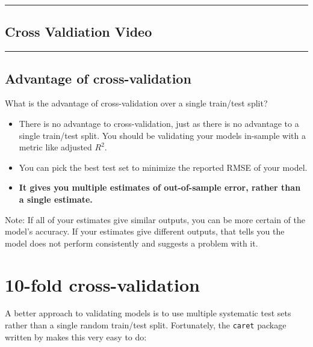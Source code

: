 \documentclass[]{book}
\begin{document}
\begin{center}\rule{0.5\linewidth}{\linethickness}\end{center}

\subsection*{Cross Valdiation Video}\label{cross-valdiation-video}

\begin{center}\rule{0.5\linewidth}{\linethickness}\end{center}

\subsection*{Advantage of
cross-validation}\label{advantage-of-cross-validation}

What is the advantage of cross-validation over a single train/test
split?

\begin{itemize}
\item
  There is no advantage to cross-validation, just as there is no
  advantage to a single train/test split. You should be validating your
  models in-sample with a metric like adjusted \(R^2\).
\item
  You can pick the best test set to minimize the reported RMSE of your
  model.
\item
  \textbf{It gives you multiple estimates of out-of-sample error, rather
  than a single estimate.}
\end{itemize}

Note: If all of your estimates give similar outputs, you can be more
certain of the model's accuracy. If your estimates give different
outputs, that tells you the model does not perform consistently and
suggests a problem with it.

\section{10-fold cross-validation}\label{fold-cross-validation}

A better approach to validating models is to use multiple systematic
test sets rather than a single random train/test split. Fortunately, the
\texttt{caret} package written by \citet{R-caret} makes this very easy
to do:
\end{document}
